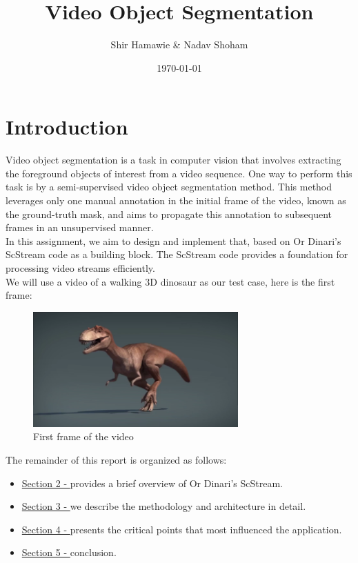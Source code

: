 \documentclass[12pt]{article}
\title{Video Object Segmentation}
\author{Shir Hamawie \& Nadav Shoham}
\date{\today}
\begin{document}
\maketitle
    \section{Introduction}\label{sec:intro}
    Video object segmentation is a task in computer vision that involves extracting the foreground objects of interest from a video sequence.
    One way to perform this task is by a semi-supervised video object segmentation method.
    This method leverages only one manual annotation in the initial frame of the video, known as the ground-truth mask, and aims to propagate this annotation to subsequent frames in an unsupervised manner. \\
    In this assignment, we aim to design and implement that, based on Or Dinari's ScStream code as a building block.
    The ScStream code provides a foundation for processing video streams efficiently. \\
We will use a video of a walking 3D dinosaur as our test case, here is the first frame:
\begin{figure}[h!]
    \centering
    \includegraphics[width=0.7\textwidth]{images/dinosaur/first_frame_ratio1.0}
    \caption{First frame of the video}
    \label{fig:dino_frame_0}
\end{figure}

The remainder of this report is organized as follows:
    \begin{itemize}
        \item \underline{Section 2 - } provides a brief overview of Or Dinari's ScStream.
        \item \underline{Section 3 - } we describe the methodology and architecture in detail.
        \item \underline{Section 4 - } presents the critical points that most influenced the application.
        \item \underline{Section 5 - } conclusion.
    \end{itemize}
\end{document}
